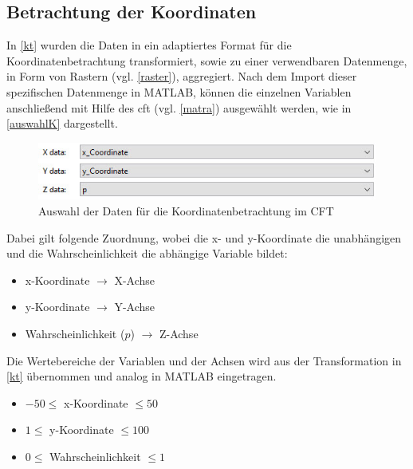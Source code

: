 
\subsection{Betrachtung der Koordinaten}
\label{bk}


In \vref{kt} wurden die Daten in ein adaptiertes Format für die Koordinatenbetrachtung transformiert, sowie zu einer verwendbaren Datenmenge, in Form von Rastern (vgl. \vref{raster}), aggregiert. Nach dem Import dieser spezifischen Datenmenge in MATLAB, können die einzelnen Variablen anschließend mit Hilfe des \gls{cft} (vgl. \vref{matra}) ausgewählt werden, wie in \vref{auswahlK} dargestellt.

\begin{figure}[H]
\centering
\includegraphics[scale=0.8]{se-wa-jpg/auswahlK}
\caption{Auswahl der Daten für die Koordinatenbetrachtung im CFT}
\label{auswahlK}
\end{figure}

Dabei gilt folgende Zuordnung, wobei die x- und y-Koordinate die unabhängigen und die Wahrscheinlichkeit die abhängige Variable bildet:

\begin{itemize}
\item x-Koordinate $\rightarrow$  X-Achse
\item y-Koordinate $\rightarrow$ Y-Achse
\item Wahrscheinlichkeit ($p$) $\rightarrow$ Z-Achse
\end{itemize}

Die Wertebereiche der Variablen und der Achsen wird aus der Transformation in \vref{kt} übernommen und analog in MATLAB eingetragen.

\begin{itemize}
\item $ -50 \le$ x-Koordinate $\le 50$
\item $ 1 \le$ y-Koordinate $\le 100$
\item $ 0 \le$ Wahrscheinlichkeit $\le 1$
\end{itemize}

